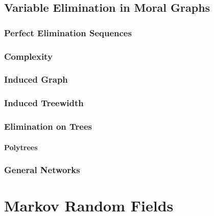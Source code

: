     \section{Variable Elimination in Moral Graphs} %

        \subsection{Perfect Elimination Sequences} %

        \subsection{Complexity} %

        \subsection{Induced Graph} %

        \subsection{Induced Treewidth} %

        \subsection{Elimination on Trees} %

            \subsubsection{Polytrees} %

        \subsection{General Networks} %

\chapter{Markov Random Fields} %

